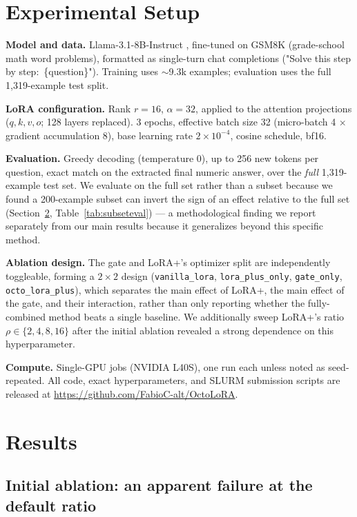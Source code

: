 \documentclass[11pt]{article}
\begin{document}
\section{Experimental Setup}
\label{sec:setup}

\textbf{Model and data.} Llama-3.1-8B-Instruct \citep{llama3modelcard},
fine-tuned on GSM8K \citep{cobbe2021gsm8k} (grade-school math word
problems), formatted as single-turn chat completions ("Solve this step by
step:\ \{question\}"). Training uses $\sim$9.3k examples; evaluation uses
the full 1{,}319-example test split.

\textbf{LoRA configuration.} Rank $r=16$, $\alpha=32$, applied to the
attention projections ($q,k,v,o$; 128 layers replaced). 3 epochs, effective
batch size 32 (micro-batch 4 $\times$ gradient accumulation 8), base
learning rate $2\times10^{-4}$, cosine schedule, bf16.

\textbf{Evaluation.} Greedy decoding (temperature 0), up to 256 new tokens
per question, exact match on the extracted final numeric answer, over the
\emph{full} 1{,}319-example test set. We evaluate on the full set rather
than a subset because we found a 200-example subset can invert the sign of
an effect relative to the full set (Section~\ref{sec:results},
Table~\ref{tab:subseteval}) — a methodological finding we report
separately from our main results because it generalizes beyond this
specific method.

\textbf{Ablation design.} The gate and LoRA+'s optimizer split are
independently toggleable, forming a $2\times2$ design (\texttt{vanilla\_lora},
\texttt{lora\_plus\_only}, \texttt{gate\_only}, \texttt{octo\_lora\_plus}),
which separates the main effect of LoRA+, the main effect of the gate, and
their interaction, rather than only reporting whether the fully-combined
method beats a single baseline. We additionally sweep LoRA+'s ratio
$\rho \in \{2, 4, 8, 16\}$ after the initial ablation revealed a strong
dependence on this hyperparameter.

\textbf{Compute.} Single-GPU jobs (NVIDIA L40S), one run each unless noted
as seed-repeated. All code, exact hyperparameters, and SLURM submission
scripts are released at \url{https://github.com/FabioC-alt/OctoLoRA}.

\section{Results}
\label{sec:results}

\subsection{Initial ablation: an apparent failure at the default ratio}
\end{document}
